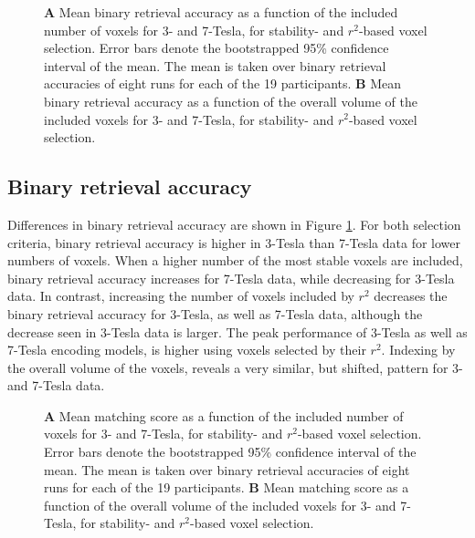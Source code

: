 \begin{figure}
  \centering
  \def\svgwidth{\linewidth}
  
	
  \caption{\textbf{A} Mean binary retrieval accuracy as a function of the
  included number of voxels for 3- and 7-Tesla, for stability- and $r^2$-based
  voxel selection. Error bars denote the bootstrapped 95\% confidence interval
  of the mean. The mean is taken over binary retrieval accuracies of eight runs
  for each of the 19 participants. \textbf{B} Mean binary retrieval accuracy as
a function of the overall volume of the included voxels for 3- and 7-Tesla, for
stability- and $r^2$-based voxel selection.
}

 \label{fig:binary_retrieval}
\end{figure}

\subsection*{Binary retrieval accuracy}

Differences in binary retrieval accuracy are shown in Figure
\ref{fig:binary_retrieval}. For both selection criteria, binary retrieval
accuracy is higher in 3-Tesla than 7-Tesla data for lower numbers of voxels.
When a higher number of the most stable voxels are included, binary retrieval
accuracy increases for 7-Tesla data, while decreasing for 3-Tesla data.    In
contrast, increasing the number of voxels included by $r^2$ decreases the
binary retrieval accuracy for 3-Tesla, as well as 7-Tesla data, although the
decrease seen in 3-Tesla data is larger. The peak performance of 3-Tesla as
well as 7-Tesla encoding models, is higher using voxels selected by their
$r^2$.  Indexing by the overall volume of the voxels, reveals a very similar,
but shifted, pattern for 3- and 7-Tesla data.

\begin{figure}
  \centering
  \def\svgwidth{\linewidth}
  
	
  \caption{\textbf{A} Mean matching score as a function of the included number
  of voxels for 3- and 7-Tesla, for stability- and $r^2$-based voxel selection.
  Error bars denote the bootstrapped 95\% confidence interval of the mean. The
  mean is taken over binary retrieval accuracies of eight runs for each of the
  19 participants. \textbf{B} Mean matching score as a function of the overall
volume of the included voxels for 3- and 7-Tesla, for stability- and
$r^2$-based voxel selection.
}

 \label{fig:matching_score}
\end{figure}

